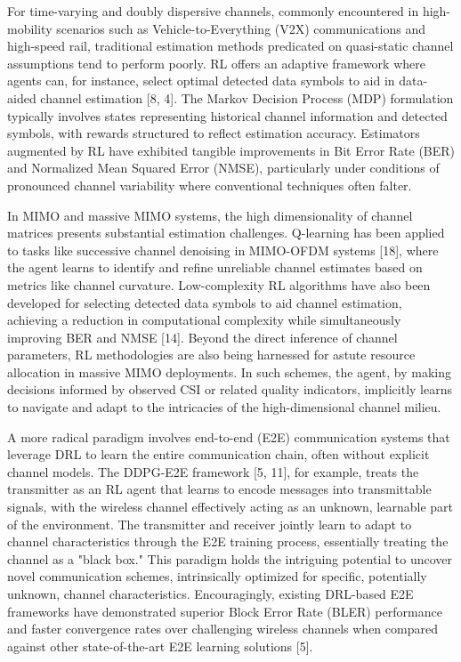 \documentclass[journal,twocolumn]{IEEEtran}
\begin{document}
For time-varying and doubly dispersive channels, commonly encountered in high-mobility scenarios such as Vehicle-to-Everything (V2X) communications and high-speed rail, traditional estimation methods predicated on quasi-static channel assumptions tend to perform poorly. RL offers an adaptive framework where agents can, for instance, select optimal detected data symbols to aid in data-aided channel estimation [8, 4]. The Markov Decision Process (MDP) formulation typically involves states representing historical channel information and detected symbols, with rewards structured to reflect estimation accuracy. Estimators augmented by RL have exhibited tangible improvements in Bit Error Rate (BER) and Normalized Mean Squared Error (NMSE), particularly under conditions of pronounced channel variability where conventional techniques often falter.

In MIMO and massive MIMO systems, the high dimensionality of channel matrices presents substantial estimation challenges. Q-learning has been applied to tasks like successive channel denoising in MIMO-OFDM systems [18], where the agent learns to identify and refine unreliable channel estimates based on metrics like channel curvature. Low-complexity RL algorithms have also been developed for selecting detected data symbols to aid channel estimation, achieving a reduction in computational complexity while simultaneously improving BER and NMSE [14]. Beyond the direct inference of channel parameters, RL methodologies are also being harnessed for astute resource allocation in massive MIMO deployments. In such schemes, the agent, by making decisions informed by observed CSI or related quality indicators, implicitly learns to navigate and adapt to the intricacies of the high-dimensional channel milieu.

A more radical paradigm involves end-to-end (E2E) communication systems that leverage DRL to learn the entire communication chain, often without explicit channel models. The DDPG-E2E framework [5, 11], for example, treats the transmitter as an RL agent that learns to encode messages into transmittable signals, with the wireless channel effectively acting as an unknown, learnable part of the environment. The transmitter and receiver jointly learn to adapt to channel characteristics through the E2E training process, essentially treating the channel as a "black box." This paradigm holds the intriguing potential to uncover novel communication schemes, intrinsically optimized for specific, potentially unknown, channel characteristics. Encouragingly, existing DRL-based E2E frameworks have demonstrated superior Block Error Rate (BLER) performance and faster convergence rates over challenging wireless channels when compared against other state-of-the-art E2E learning solutions [5].
\end{document}
